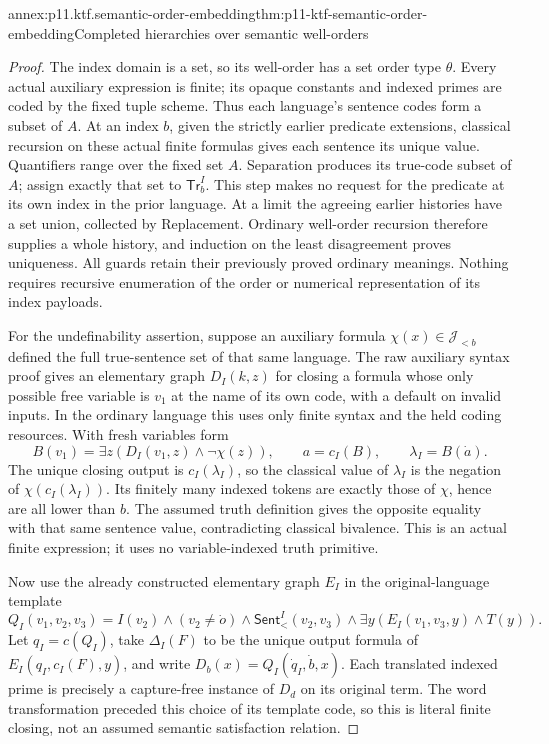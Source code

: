 \begin{annexitem}{annex:p11.ktf.semantic-order-embedding}{thm:p11-ktf-semantic-order-embedding}{Completed hierarchies over semantic well-orders}
\begin{proof}
The index domain is a set, so its well-order has a set order type
\(\theta\). Every actual auxiliary expression is finite; its
opaque constants and indexed primes are coded by the fixed tuple
scheme. Thus each language's sentence codes form a subset of \(A\).
At an index \(b\), given the strictly earlier predicate
extensions, classical recursion on these actual finite formulas
gives each sentence its unique value. Quantifiers range over the
fixed set \(A\). Separation produces its true-code subset of
\(A\); assign exactly that set to \(\mathsf{Tr}^{I}_b\).
This step makes no request for the predicate at its own index in
the prior language. At a limit the agreeing earlier histories have
a set union, collected by Replacement. Ordinary well-order recursion
therefore supplies a whole history, and induction on the least
disagreement proves uniqueness. All guards retain their previously
proved ordinary meanings. Nothing requires recursive enumeration of
the order or numerical representation of its index payloads.

For the undefinability assertion, suppose an auxiliary formula
\(\chi(x)\in\mathcal J_{<b}\) defined the full true-sentence
set of that same language. The raw auxiliary syntax proof gives an
elementary graph \(D_I(k,z)\) for closing a formula whose only
possible free variable is \(v_1\) at the name of its own code,
with a default on invalid
inputs. In the ordinary language this uses only finite syntax and
the held coding resources. With fresh variables form
\[
 B(v_1)=\exists z(D_I(v_1,z)\land\neg\chi(z)),\qquad
 a=c_I(B),\qquad \lambda_I=B(\dot a).
\]
The unique closing output is \(c_I(\lambda_I)\), so the
classical value of \(\lambda_I\) is the negation of
\(\chi(c_I(\lambda_I))\). Its finitely many indexed tokens
are exactly those of \(\chi\), hence are all lower than \(b\).
The assumed truth definition gives the opposite equality with that
same sentence value, contradicting classical bivalence. This is an
actual finite expression; it uses no variable-indexed truth primitive.

Now use the already constructed elementary graph \(E_I\) in
the original-language template
\[
 Q_I(v_1,v_2,v_3)=I(v_2)\land(v_2\ne\dot o)\land
  \mathsf{Sent}^{I}_{<}(v_2,v_3)\land
  \exists y(E_I(v_1,v_3,y)\land T(y)).
\]
Let \(q_I=c(Q_I)\), take \(\Delta_I(F)\) to be the
unique output formula of \(E_I(q_I,c_I(F),y)\), and write
\(D_b(x)=Q_I(\dot q_I,\dot b,x)\). Each translated indexed
prime is precisely a capture-free instance of \(D_d\) on its
original term. The word transformation preceded this choice of its
template code, so this is literal finite closing, not an assumed
semantic satisfaction relation.


\end{proof}
\end{annexitem}
